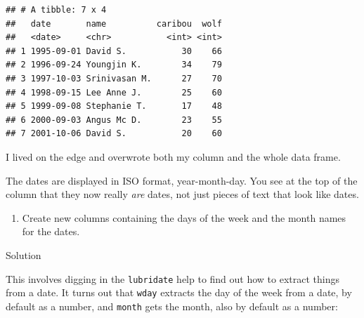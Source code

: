\documentclass[]{tufte-book}
\newenvironment{Shaded}{}{}
\newcommand{\DataTypeTok}[1]{\textcolor[rgb]{0.56,0.13,0.00}{#1}}
\newcommand{\KeywordTok}[1]{\textcolor[rgb]{0.00,0.44,0.13}{\textbf{#1}}}
\newcommand{\NormalTok}[1]{#1}
\newcommand{\OperatorTok}[1]{\textcolor[rgb]{0.40,0.40,0.40}{#1}}
\newcommand{\StringTok}[1]{\textcolor[rgb]{0.25,0.44,0.63}{#1}}
\providecommand{\tightlist}{%
  \setlength{\itemsep}{0pt}\setlength{\parskip}{0pt}}
\theoremstyle{definition}
\theoremstyle{definition}
\theoremstyle{definition}
\theoremstyle{remark}
\begin{document}
\begin{Shaded}
\end{Shaded}

\begin{verbatim}
## # A tibble: 7 x 4
##   date       name          caribou  wolf
##   <date>     <chr>           <int> <int>
## 1 1995-09-01 David S.           30    66
## 2 1996-09-24 Youngjin K.        34    79
## 3 1997-10-03 Srinivasan M.      27    70
## 4 1998-09-15 Lee Anne J.        25    60
## 5 1999-09-08 Stephanie T.       17    48
## 6 2000-09-03 Angus Mc D.        23    55
## 7 2001-10-06 David S.           20    60
\end{verbatim}

I lived on the edge and overwrote both my column and the whole data
frame.

The dates are displayed in ISO format, year-month-day. You see at the
top of the column that they now really \emph{are} dates, not just pieces
of text that look like dates.

\begin{enumerate}
\def\labelenumi{(\alph{enumi})}
\setcounter{enumi}{2}
\tightlist
\item
  Create new columns containing the days of the week and the month names
  for the dates.
\end{enumerate}

Solution

This involves digging in the \texttt{lubridate} help to find out how to
extract things from a date. It turns out that \texttt{wday} extracts the
day of the week from a date, by default as a number, and \texttt{month}
gets the month, also by default as a number:

\begin{Shaded}
\end{Shaded}
\end{document}
